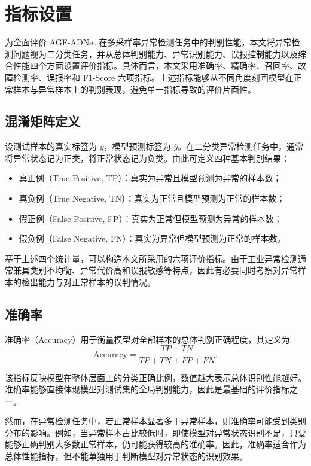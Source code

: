 \section{指标设置}

为全面评价 AGF-ADNet 在多采样率异常检测任务中的判别性能，本文将异常检测问题视为二分类任务，并从总体判别能力、异常识别能力、误报控制能力以及综合性能四个方面设置评价指标。具体而言，本文采用准确率、精确率、召回率、故障检测率、误报率和 F1-Score 六项指标。上述指标能够从不同角度刻画模型在正常样本与异常样本上的判别表现，避免单一指标导致的评价片面性。

\subsection{混淆矩阵定义}

设测试样本的真实标签为 $y$，模型预测标签为 $\hat{y}$。在二分类异常检测任务中，通常将异常状态记为正类，将正常状态记为负类。由此可定义四种基本判别结果：
\begin{itemize}
    \item 真正例（True Positive, TP）：真实为异常且模型预测为异常的样本数；
    \item 真负例（True Negative, TN）：真实为正常且模型预测为正常的样本数；
    \item 假正例（False Positive, FP）：真实为正常但模型预测为异常的样本数；
    \item 假负例（False Negative, FN）：真实为异常但模型预测为正常的样本数。
\end{itemize}

基于上述四个统计量，可以构造本文所采用的六项评价指标。由于工业异常检测通常兼具类别不均衡、异常代价高和误报敏感等特点，因此有必要同时考察对异常样本的检出能力与对正常样本的误判情况。

\subsection{准确率}

准确率（Accuracy）用于衡量模型对全部样本的总体判别正确程度，其定义为
\begin{equation}
    \mathrm{Accuracy}
    =
    \frac{TP + TN}{TP + TN + FP + FN}.
\end{equation}

该指标反映模型在整体层面上的分类正确比例，数值越大表示总体识别性能越好。准确率能够直接体现模型对测试集的全局判别能力，因此是最基础的评价指标之一。

然而，在异常检测任务中，若正常样本显著多于异常样本，则准确率可能受到类别分布的影响。例如，当异常样本占比较低时，即使模型对异常状态识别不足，只要能够正确判别大多数正常样本，仍可能获得较高的准确率。因此，准确率适合作为总体性能指标，但不能单独用于判断模型对异常状态的识别效果。

